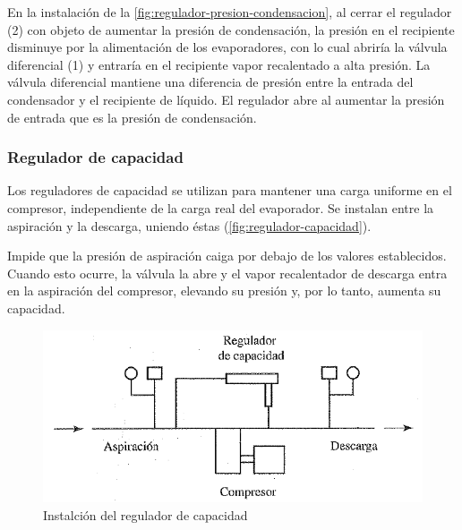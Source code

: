 En la instalaci\'on de la \autoref{fig:regulador-presion-condensacion}, al cerrar el regulador (2) con objeto de aumentar la presi\'on de condensaci\'on, la presi\'on en el recipiente disminuye por la alimentaci\'on de los evaporadores, con lo cual abrir\'ia la v\'alvula diferencial (1) y entrar\'ia en el recipiente vapor recalentado a alta presi\'on. La v\'alvula diferencial mantiene una diferencia de presi\'on entre la entrada del condensador y el recipiente de l\'iquido. El regulador abre al aumentar la presi\'on de entrada que es la presi\'on de condensaci\'on.

\subsubsection{Regulador de capacidad}

Los reguladores de capacidad se utilizan para mantener una carga uniforme en el compresor, independiente de la carga real del evaporador. Se instalan entre la aspiraci\'on y la descarga, uniendo \'estas (\autoref{fig:regulador-capacidad}).

Impide que la presi\'on de aspiraci\'on caiga por debajo de los valores establecidos. Cuando esto ocurre, la v\'alvula la abre y el vapor recalentador de descarga entra en la aspiraci\'on del compresor, elevando su presi\'on y, por lo tanto, aumenta su capacidad. 

\begin{figure}[H]
    \centering
    \includegraphics[width=.6\linewidth]{figuras/dispositivos-de-expansion/regulador-capacidad.png}
    \caption{Instalci\'on del regulador de capacidad}
    \label{fig:regulador-capacidad}
\end{figure}